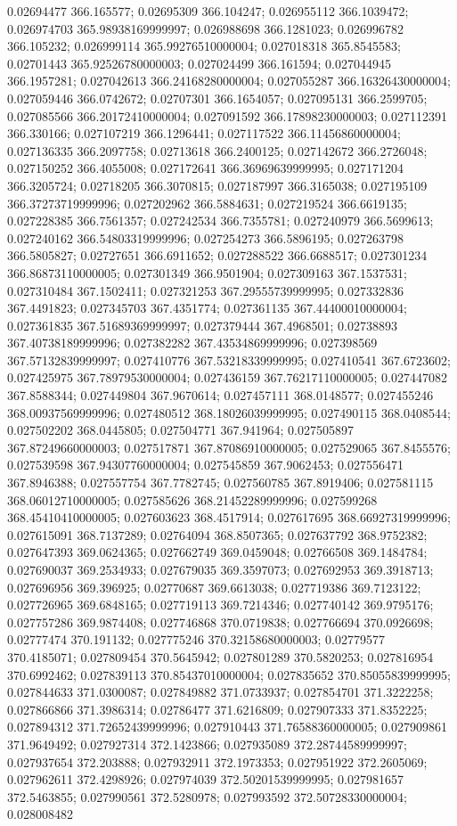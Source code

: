 0.02694477 366.165577; 0.02695309 366.104247; 0.026955112 366.1039472; 0.026974703 365.98938169999997; 0.026988698 366.1281023; 0.026996782 366.105232; 0.026999114 365.99276510000004; 0.027018318 365.8545583; 0.02701443 365.92526780000003; 0.027024499 366.161594; 0.027044945 366.1957281; 0.027042613 366.24168280000004; 0.027055287 366.16326430000004; 0.027059446 366.0742672; 0.02707301 366.1654057; 0.027095131 366.2599705; 0.027085566 366.20172410000004; 0.027091592 366.17898230000003; 0.027112391 366.330166; 0.027107219 366.1296441; 0.027117522 366.11456860000004; 0.027136335 366.2097758; 0.02713618 366.2400125; 0.027142672 366.2726048; 0.027150252 366.4055008; 0.027172641 366.36969639999995; 0.027171204 366.3205724; 0.02718205 366.3070815; 0.027187997 366.3165038; 0.027195109 366.37273719999996; 0.027202962 366.5884631; 0.027219524 366.6619135; 0.027228385 366.7561357; 0.027242534 366.7355781; 0.027240979 366.5699613; 0.027240162 366.54803319999996; 0.027254273 366.5896195; 0.027263798 366.5805827; 0.02727651 366.6911652; 0.027288522 366.6688517; 0.027301234 366.86873110000005; 0.027301349 366.9501904; 0.027309163 367.1537531; 0.027310484 367.1502411; 0.027321253 367.29555739999995; 0.027332836 367.4491823; 0.027345703 367.4351774; 0.027361135 367.44400010000004; 0.027361835 367.51689369999997; 0.027379444 367.4968501; 0.02738893 367.40738189999996; 0.027382282 367.43534869999996; 0.027398569 367.57132839999997; 0.027410776 367.53218339999995; 0.027410541 367.6723602; 0.027425975 367.78979530000004; 0.027436159 367.76217110000005; 0.027447082 367.8588344; 0.027449804 367.9670614; 0.027457111 368.0148577; 0.027455246 368.00937569999996; 0.027480512 368.18026039999995; 0.027490115 368.0408544; 0.027502202 368.0445805; 0.027504771 367.941964; 0.027505897 367.87249660000003; 0.027517871 367.87086910000005; 0.027529065 367.8455576; 0.027539598 367.94307760000004; 0.027545859 367.9062453; 0.027556471 367.8946388; 0.027557754 367.7782745; 0.027560785 367.8919406; 0.027581115 368.06012710000005; 0.027585626 368.21452289999996; 0.027599268 368.45410410000005; 0.027603623 368.4517914; 0.027617695 368.66927319999996; 0.027615091 368.7137289; 0.02764094 368.8507365; 0.027637792 368.9752382; 0.027647393 369.0624365; 0.027662749 369.0459048; 0.02766508 369.1484784; 0.027690037 369.2534933; 0.027679035 369.3597073; 0.027692953 369.3918713; 0.027696956 369.396925; 0.02770687 369.6613038; 0.027719386 369.7123122; 0.027726965 369.6848165; 0.027719113 369.7214346; 0.027740142 369.9795176; 0.027757286 369.9874408; 0.027746868 370.0719838; 0.027766694 370.0926698; 0.02777474 370.191132; 0.027775246 370.32158680000003; 0.02779577 370.4185071; 0.027809454 370.5645942; 0.027801289 370.5820253; 0.027816954 370.6992462; 0.027839113 370.85437010000004; 0.027835652 370.85055839999995; 0.027844633 371.0300087; 0.027849882 371.0733937; 0.027854701 371.3222258; 0.027866866 371.3986314; 0.02786477 371.6216809; 0.027907333 371.8352225; 0.027894312 371.72652439999996; 0.027910443 371.76588360000005; 0.027909861 371.9649492; 0.027927314 372.1423866; 0.027935089 372.28744589999997; 0.027937654 372.203888; 0.027932911 372.1973353; 0.027951922 372.2605069; 0.027962611 372.4298926; 0.027974039 372.50201539999995; 0.027981657 372.5463855; 0.027990561 372.5280978; 0.027993592 372.50728330000004; 0.028008482 